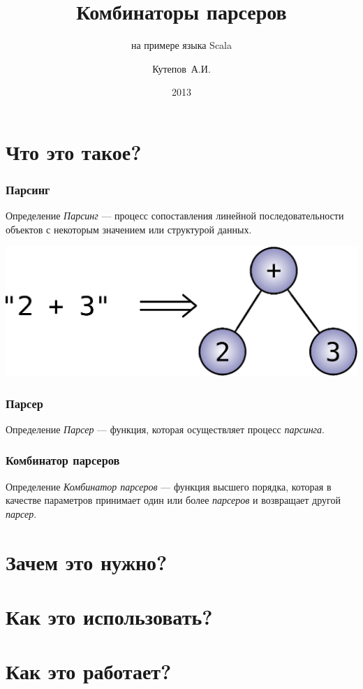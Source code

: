 \documentclass{beamer}
\title{Комбинаторы парсеров}
\subtitle{на примере языка Scala}
\author{Кутепов~А.И.}
\date{2013}
\begin{document}
\begin{frame}
  \titlepage
\end{frame}

\begin{frame}
  \tableofcontents
\end{frame}

\section{Что это такое?}

\begin{frame}
  \frametitle{Парсинг}
  \pause
  \begin{block}{Определение}
    \textit{Парсинг} --- процесс сопоставления линейной
    последовательности объектов с некоторым значением или структурой
    данных.
  \end{block}
  \pause
  \includegraphics[scale=0.50]{images/parsing-example.eps}
\end{frame}

\begin{frame}
  \frametitle{Парсер}
  \begin{block}{Определение}
    \textit{Парсер} --- функция, которая осуществляет процесс
    \textit{парсинга}.
  \end{block}
\end{frame}

\begin{frame}
  \frametitle{Комбинатор парсеров}
  \begin{block}{Определение}
    \textit{Комбинатор парсеров} --- функция высшего порядка, которая
    в качестве параметров принимает один или более \textit{парсеров} и
    возвращает другой \textit{парсер}.
  \end{block}
\end{frame}

\section{Зачем это нужно?}

\section{Как это использовать?}

\section{Как это работает?}
\end{document}
